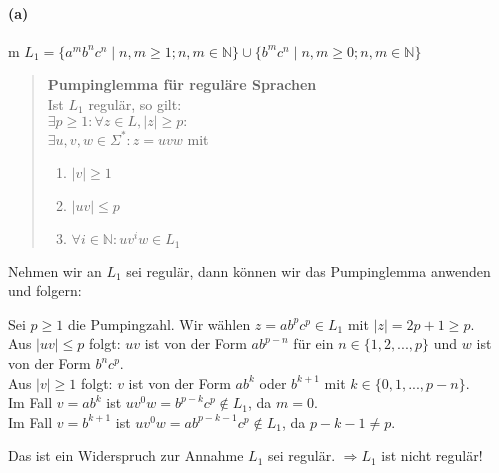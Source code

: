 
\paragraph{(a)}m
	$L_1 = \{a^mb^nc^n \mid n,m \geq 1; n,m \in \mathbb{N} \} \cup \{ b^m c^n \mid n,m \geq 0; n,m \in \mathbb{N}\}$	
	
	\begin{quote}
	\textbf{Pumpinglemma für reguläre Sprachen} \\
    Ist $L_1$ regulär, so gilt: \\
    $\exists p \geq 1: \forall z \in L, |z| \geq p:$ \\
    $\exists u,v,w \in \Sigma^*: z = uvw$ mit
    \begin{enumerate}
    	\item $|v|  \geq 1$
    	\item $|uv| \leq p$
    	\item $\forall i \in \mathbb{N} : uv^{i}w \in L_1$
    \end{enumerate}
	\end{quote}
	
	Nehmen wir an $L_1$ sei regulär, dann können wir das Pumpinglemma anwenden und folgern:
	
	Sei $p \geq 1$ die Pumpingzahl. Wir wählen $z = ab^pc^p \in L_1$ mit $|z| = 2p+1 \geq p$.\\
	Aus $|uv| \leq p$ folgt: $uv$ ist von der Form $ab^{p-n}$ für ein $n \in \{1,2,...,p\}$ und $w$ ist von der Form $b^nc^p$.\\
	Aus $|v|  \geq 1$ folgt: $v$ ist von der Form $ab^k$ oder $b^{k+1}$ mit $k \in \{0,1,...,p-n\}$.\\
	Im Fall $v=ab^k$ ist $uv^0w=b^{p-k}c^p \notin L_1$, da $m=0$.\\
	Im Fall $v=b^{k+1}$ ist $uv^0w=ab^{p-k-1}c^p \notin L_1$, da $p-k-1\neq p$.
	
	Das ist ein Widerspruch zur Annahme $L_1$ sei regulär. $\Rightarrow L_1$ ist nicht regulär!
    
    \vspace{0.3cm}
	
